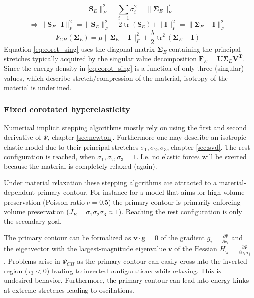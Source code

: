 \documentclass[m,times]{cgMA}
\begin{document}
$$\| \boldsymbol{S}_E \| _ { F }^2 = \sum _ { i = 1 } \sigma _ { i } ^ { 2 } = \| \boldsymbol{\Sigma}_E\|_{F}^2$$
$$\Rightarrow \| \boldsymbol{S}_E\boldsymbol{-I} \| _ { F }^2 = \|\boldsymbol{S}_E \| _ { F }^2 - 2 \operatorname{tr}(\boldsymbol{S}_E)  + \|\boldsymbol{I}\|_{F}^2 = \| \boldsymbol { \Sigma }_E - \boldsymbol { I } \| _ { F } ^ { 2 }$$
\begin{equation} \label{eq:corot_sing}
  \Psi_{CH}(\boldsymbol{\Sigma}_E) = \mu \| \boldsymbol { \Sigma }_E - \boldsymbol { I } \| _ { F } ^ { 2 } + \frac { \lambda } { 2 } \operatorname { tr } ^ { 2 } ( \boldsymbol { \Sigma }_E - \boldsymbol { I } )
\end{equation}
Equation \ref{eq:corot_sing} uses the diagonal matrix $\boldsymbol{\Sigma}_E$ containing the principal stretches typically acquired by the singular value decomposition $\boldsymbol{F}_E \boldsymbol{= U \Sigma}_E\boldsymbol{ V ^T }.$ Since the energy density in \ref{eq:corot_sing} is a function of only three (singular) values, which describe stretch/compression of the material, isotropy of the material is underlined.
\begin{flushright}\cite{ADAMS:ELASTICITY}\end{flushright}
\subsubsection{Fixed corotated hyperelasticity}
Numerical implicit stepping algorithms mostly rely on using the first and second derivative of $\Psi$, chapter \ref{sec:newton}. Furthermore one may describe an isotropic elastic model due to their principal stretches $\sigma_1,\sigma_2,\sigma_3$, chapter \ref{sec:svd}. The rest configuration is reached, when $\sigma_1,\sigma_2,\sigma_3 = 1$. I.e. no elastic forces will be exerted because the material is completely relaxed (again).

Under material relaxation these stepping algorithms are attracted to a material-dependent primary contour. For instance for a model that aims for high volume preservation (Poisson ratio $\nu =0.5$) the primary contour is primarily enforcing volume preservation ($ J_E = \sigma_1\sigma_2\sigma_3 \approx 1$). Reaching the rest configuration is only the secondary goal.

The primary contour can be formalized as $\boldsymbol{v}\cdot \boldsymbol{g} = 0$ of the gradient $g_i = \frac{\partial \Psi}{\partial \sigma_i}$ and the eigenvector with the largest-magnitude eigenvalue $\boldsymbol{v}$ of the Hessian $H_{ij} = \frac{\partial \Psi}{\partial \sigma_i \sigma_j}$. Problems arise in $\Psi_{CH}$ as the primary contour can easily cross into the inverted region ($\sigma_3 < 0$) leading to inverted configurations while relaxing. This is undesired behavior. Furthermore, the primary contour can lead into energy kinks at extreme stretches leading to oscillations.
\end{document}
